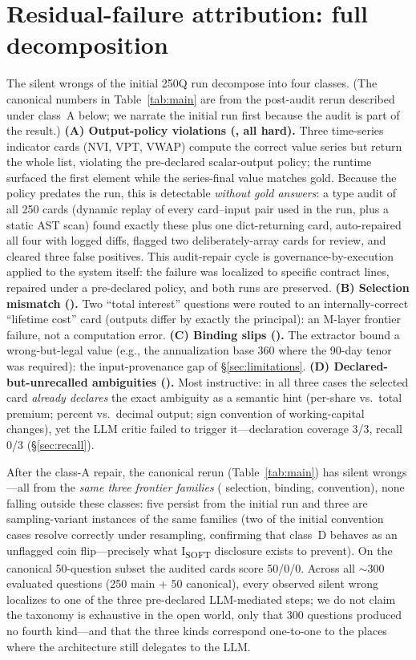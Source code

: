 \section{Residual-failure attribution: full decomposition}\label{app:attribution}
The \swResidual{} silent wrongs of the initial 250Q run decompose into four classes.
(The canonical numbers in Table~\ref{tab:main} are from the post-audit rerun described under class~A below; we narrate the initial run first because the audit is part of the result.)
\textbf{(A) Output-policy violations (\swClassA{}, all hard).} Three time-series indicator cards (NVI, VPT, VWAP) compute the correct value series but return the whole list, violating the pre-declared scalar-output policy; the runtime surfaced the first element while the series-final value matches gold.
Because the policy predates the run, this is detectable \emph{without gold answers}: a type audit of all 250 cards (dynamic replay of every card--input pair used in the run, plus a static AST scan) found exactly these plus one dict-returning card, auto-repaired all four with logged diffs, flagged two deliberately-array cards for review, and cleared three false positives.
This audit-repair cycle is governance-by-execution applied to the system itself: the failure was localized to specific contract lines, repaired under a pre-declared policy, and both runs are preserved.
\textbf{(B) Selection mismatch (\swClassB{}).} Two ``total interest'' questions were routed to an internally-correct ``lifetime cost'' card (outputs differ by exactly the principal): an M-layer frontier failure, not a computation error.
\textbf{(C) Binding slips (\swClassC{}).} The extractor bound a wrong-but-legal value (e.g., the annualization base 360 where the 90-day tenor was required): the input-provenance gap of \S\ref{sec:limitations}.
\textbf{(D) Declared-but-unrecalled ambiguities (\swClassD{}).} Most instructive: in all three cases the selected card \emph{already declares} the exact ambiguity as a semantic hint (per-share vs.\ total premium; percent vs.\ decimal output; sign convention of working-capital changes), yet the LLM critic failed to trigger it---declaration coverage 3/3, recall 0/3 (\S\ref{sec:recall}).

After the class-A repair, the canonical rerun (Table~\ref{tab:main}) has \swResidualCanon{} silent wrongs---all from the \emph{same three frontier families} (\swCanonB{} selection, \swCanonC{} binding, \swCanonD{} convention), none falling outside these classes: five persist from the initial run and three are sampling-variant instances of the same families (two of the initial convention cases resolve correctly under resampling, confirming that class~D behaves as an unflagged coin flip---precisely what I\textsubscript{SOFT} disclosure exists to prevent).
On the canonical 50-question subset the audited cards score 50/0/0.
Across all $\sim$300 evaluated questions (250 main + 50 canonical), every observed silent wrong localizes to one of the three pre-declared LLM-mediated steps; we do not claim the taxonomy is exhaustive in the open world, only that 300 questions produced no fourth kind---and that the three kinds correspond one-to-one to the places where the architecture still delegates to the LLM.

